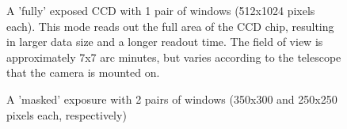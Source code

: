 \begin{figure}
  \centering
  \setlength{\fboxsep}{0pt}
  \setlength{\fboxrule}{1pt}
  \caption{A 'fully' exposed CCD with 1 pair of windows (512x1024 pixels each).  This mode reads out the full area of the CCD chip, resulting in larger data size and a longer readout time. The field of view is approximately 7x7 arc minutes, but varies according to the telescope that the camera is mounted on.}
  \label{fig:KOI-824}
\end{figure}

\begin{figure}  
  \centering
  \setlength{\fboxsep}{0pt}
  \setlength{\fboxrule}{1pt}
  \caption{A 'masked' exposure with 2 pairs of windows (350x300 and 250x250 pixels each, respectively)}
  \label{fig:V713Cep}
\end{figure}

